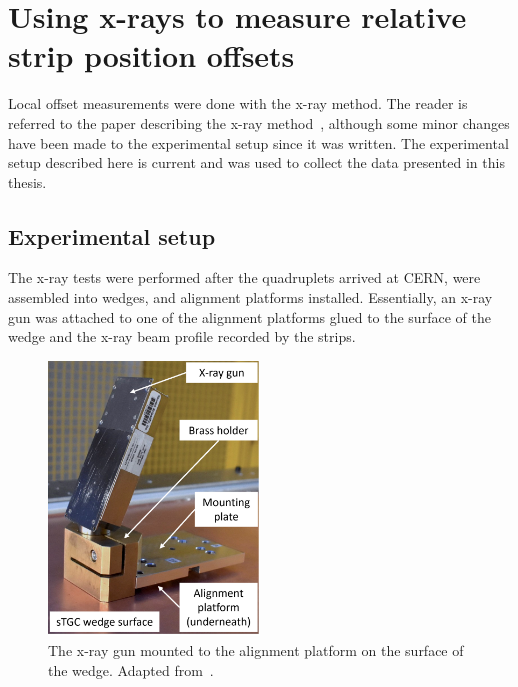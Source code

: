 
\chapter{Using x-rays to measure relative strip position offsets}
\label{chap:xray}

Local offset measurements were done with the x-ray method. The reader is referred to the paper describing the x-ray method~\cite{lefebvre_precision_2020}, although some minor changes have been made to the experimental setup since it was written. The experimental setup described here is current and was used to collect the data presented in this thesis.

\section{Experimental setup}

The x-ray tests were performed after the quadruplets arrived at CERN, were assembled into wedges, and alignment platforms installed. Essentially, an x-ray gun was attached to one of the alignment platforms glued to the surface of the wedge and the x-ray beam profile recorded by the strips.

\begin{figure}[t]
    \centering
    \includegraphics[width = 0.5\textwidth]{figures/xray_setup.png}
    \caption{The x-ray gun mounted to the alignment platform on the surface of the wedge. Adapted from~\cite{lefebvre_precision_2020}.}
    \label{fig:xray_setup}
\end{figure}

